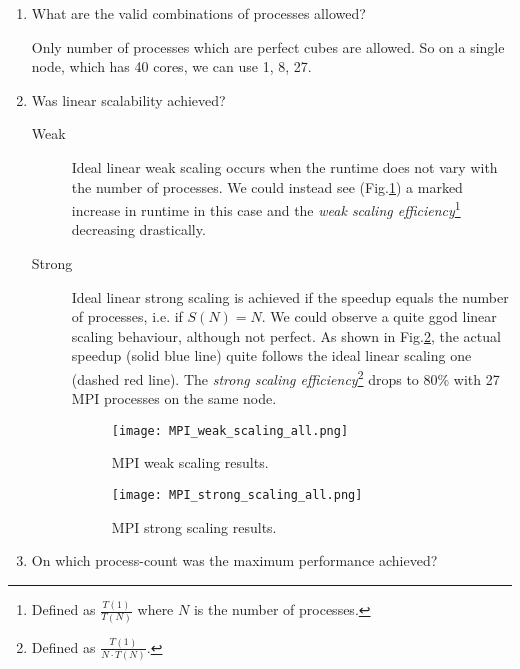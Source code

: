 \documentclass{article}
\begin{document}
\begin{enumerate}
	\item{What are the valid combinations of processes allowed?

	Only number of processes which are perfect cubes are allowed. So on a single node, which has 40 cores, we can use 1, 8, 27.
	}

	\item Was linear scalability achieved?

	\begin{description}
		\item[Weak]	 Ideal linear weak scaling occurs when the runtime does not vary with the number of processes. We could instead see (Fig.\ref{fig:MPI_weakScaling}) a marked increase in runtime in this case and the \emph{weak scaling efficiency}\footnote{Defined as $\frac{T(1)}{T(N)}$ where $N$ is the number of processes.} decreasing drastically.

		\item[Strong] Ideal linear strong scaling is achieved if the speedup equals the number of processes, i.e. if $S(N) = N$. We could observe a quite ggod linear scaling behaviour, although not perfect. As shown in Fig.\ref{fig:MPI_strongScaling}, the actual speedup (solid blue line) quite follows the ideal linear scaling one (dashed red line). The \emph{strong scaling efficiency}\footnote{Defined as $\frac{T(1)}{N \cdot T(N)}$.} drops to $80\%$ with 27 MPI processes on the same node.

		\begin{figure}[p] %
		 	\begin{center}
		 		\texttt{[image: MPI\_weak\_scaling\_all.png]} %
		 		\caption{MPI weak scaling results.}
		 		\label{fig:MPI_weakScaling}
		 	\end{center}
		\end{figure}
		\begin{figure}[p] %
		 	\begin{center}
		 		\texttt{[image: MPI\_strong\_scaling\_all.png]} %
		 		\caption{MPI strong scaling results.}
		 		\label{fig:MPI_strongScaling}
		 	\end{center}
		\end{figure}
	\end{description}

	\item On which process-count was the maximum performance achieved?


\end{enumerate}
\end{document}
